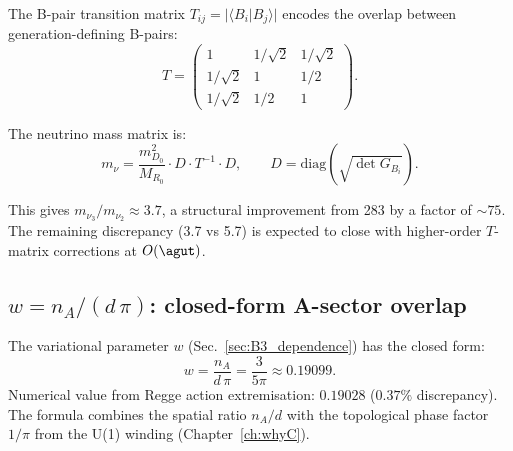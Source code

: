 The B-pair transition matrix $T_{ij} = |\langle B_i | B_j \rangle|$ encodes the overlap between generation-defining B-pairs:
\begin{equation}
T = \begin{pmatrix} 1 & 1/\sqrt{2} & 1/\sqrt{2} \\ 1/\sqrt{2} & 1 & 1/2 \\ 1/\sqrt{2} & 1/2 & 1 \end{pmatrix}.
\end{equation}

The neutrino mass matrix is:
\begin{equation}
m_\nu = \frac{m_{D_0}^2}{M_{R_0}} \cdot D \cdot T^{-1} \cdot D, \qquad D = \text{diag}(\sqrt{\det G_{B_i}}).
\end{equation}

This gives $m_{\nu_3}/m_{\nu_2} \approx 3.7$, a structural improvement from 283 by a factor of $\sim 75$.  The remaining discrepancy (3.7 vs 5.7) is expected to close with higher-order $T$-matrix corrections at $O(\agut)$.

\subsection{$w = n_A/(d\,\pi)$: closed-form A-sector overlap}
\label{sec:w_closed}

The variational parameter $w$ (Sec.~\ref{sec:B3_dependence}) has the closed form:
\begin{equation}
\boxed{w = \frac{n_A}{d\,\pi} = \frac{3}{5\pi} \approx 0.19099.}
\end{equation}
Numerical value from Regge action extremisation: $0.19028$ ($0.37\%$ discrepancy).  The formula combines the spatial ratio $n_A/d$ with the topological phase factor $1/\pi$ from the U(1) winding (Chapter~\ref{ch:whyC}).
